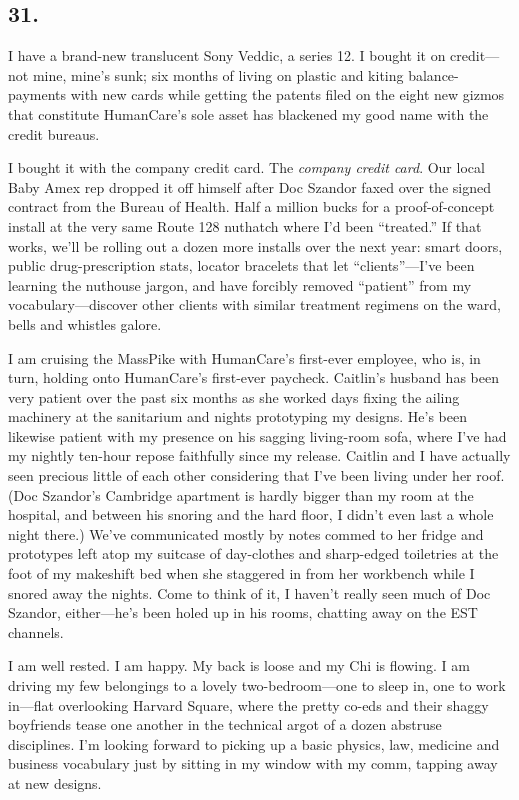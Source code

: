 \subsection{31.}

I have a brand-new translucent Sony Veddic, a series 12. I bought
it on credit—not mine, mine’s sunk; six months of living on plastic
and kiting balance-payments with new cards while getting the
patents filed on the eight new gizmos that constitute HumanCare’s
sole asset has blackened my good name with the credit bureaus.

I bought it with the company credit card. The
\emph{company credit card}. Our local Baby Amex rep dropped it off
himself after Doc Szandor faxed over the signed contract from the
Bureau of Health. Half a million bucks for a proof-of-concept
install at the very same Route 128 nuthatch where I’d been
“treated.” If that works, we’ll be rolling out a dozen more
installs over the next year: smart doors, public drug-prescription
stats, locator bracelets that let “clients”—I’ve been learning the
nuthouse jargon, and have forcibly removed “patient” from my
vocabulary—discover other clients with similar treatment regimens
on the ward, bells and whistles galore.

I am cruising the MassPike with HumanCare’s first-ever employee,
who is, in turn, holding onto HumanCare’s first-ever paycheck.
Caitlin’s husband has been very patient over the past six months as
she worked days fixing the ailing machinery at the sanitarium and
nights prototyping my designs. He’s been likewise patient with my
presence on his sagging living-room sofa, where I’ve had my nightly
ten-hour repose faithfully since my release. Caitlin and I have
actually seen precious little of each other considering that I’ve
been living under her roof. (Doc Szandor’s Cambridge apartment is
hardly bigger than my room at the hospital, and between his snoring
and the hard floor, I didn’t even last a whole night there.) We’ve
communicated mostly by notes commed to her fridge and prototypes
left atop my suitcase of day-clothes and sharp-edged toiletries at
the foot of my makeshift bed when she staggered in from her
workbench while I snored away the nights. Come to think of it, I
haven’t really seen much of Doc Szandor, either—he’s been holed up
in his rooms, chatting away on the EST channels.

I am well rested. I am happy. My back is loose and my Chi is
flowing. I am driving my few belongings to a lovely two-bedroom—one
to sleep in, one to work in—flat overlooking Harvard Square, where
the pretty co-eds and their shaggy boyfriends tease one another in
the technical argot of a dozen abstruse disciplines. I’m looking
forward to picking up a basic physics, law, medicine and business
vocabulary just by sitting in my window with my comm, tapping away
at new designs.

